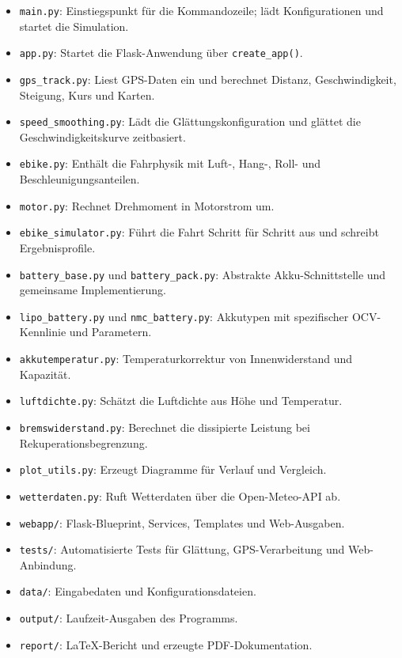 \begin{itemize}
\item \texttt{main.py}: Einstiegspunkt für die Kommandozeile; lädt Konfigurationen und startet die Simulation.
\item \texttt{app.py}: Startet die Flask-Anwendung über \texttt{create\_app()}.
\item \texttt{gps\_track.py}: Liest GPS-Daten ein und berechnet Distanz, Geschwindigkeit, Steigung, Kurs und Karten.
\item \texttt{speed\_smoothing.py}: Lädt die Glättungskonfiguration und glättet die Geschwindigkeitskurve zeitbasiert.
\item \texttt{ebike.py}: Enthält die Fahrphysik mit Luft-, Hang-, Roll- und Beschleunigungsanteilen.
\item \texttt{motor.py}: Rechnet Drehmoment in Motorstrom um.
\item \texttt{ebike\_simulator.py}: Führt die Fahrt Schritt für Schritt aus und schreibt Ergebnisprofile.
\item \texttt{battery\_base.py} und \texttt{battery\_pack.py}: Abstrakte Akku-Schnittstelle und gemeinsame Implementierung.
\item \texttt{lipo\_battery.py} und \texttt{nmc\_battery.py}: Akkutypen mit spezifischer OCV-Kennlinie und Parametern.
\item \texttt{akkutemperatur.py}: Temperaturkorrektur von Innenwiderstand und Kapazität.
\item \texttt{luftdichte.py}: Schätzt die Luftdichte aus Höhe und Temperatur.
\item \texttt{bremswiderstand.py}: Berechnet die dissipierte Leistung bei Rekuperationsbegrenzung.
\item \texttt{plot\_utils.py}: Erzeugt Diagramme für Verlauf und Vergleich.
\item \texttt{wetterdaten.py}: Ruft Wetterdaten über die Open-Meteo-API ab.
\item \texttt{webapp/}: Flask-Blueprint, Services, Templates und Web-Ausgaben.
\item \texttt{tests/}: Automatisierte Tests für Glättung, GPS-Verarbeitung und Web-Anbindung.
\item \texttt{data/}: Eingabedaten und Konfigurationsdateien.
\item \texttt{output/}: Laufzeit-Ausgaben des Programms.
\item \texttt{report/}: LaTeX-Bericht und erzeugte PDF-Dokumentation.
\end{itemize}

